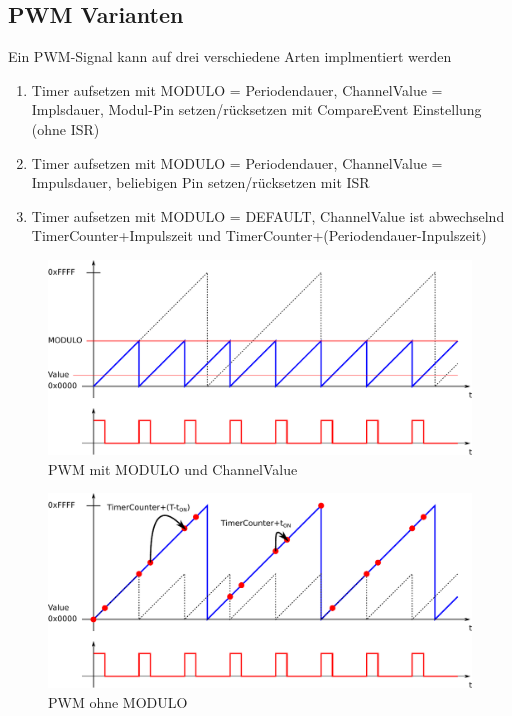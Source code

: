 \newpage
\subsection{PWM Varianten}
Ein PWM-Signal kann auf drei verschiedene Arten implmentiert werden
\begin{enumerate}
	\item Timer aufsetzen mit MODULO = Periodendauer, 
		ChannelValue = Implsdauer, Modul-Pin setzen/rücksetzen mit
		CompareEvent Einstellung (ohne ISR)
	\item Timer aufsetzen mit MODULO = Periodendauer,
		ChannelValue = Impulsdauer, beliebigen Pin setzen/rücksetzen
		mit ISR
	\item Timer aufsetzen mit MODULO = DEFAULT, ChannelValue ist
		abwechselnd TimerCounter+Impulszeit und
		TimerCounter+(Periodendauer-Inpulszeit)
\end{enumerate}

\begin{figure}[h!]
	\centering
	\includegraphics[width=1\textwidth]{../fig/pwm_01.pdf}
	\caption{PWM mit MODULO und ChannelValue}
\end{figure}

\begin{figure}[h!]
	\centering
	\includegraphics[width=1\textwidth]{../fig/pwm_02.pdf}
	\caption{PWM ohne MODULO}
\end{figure}

